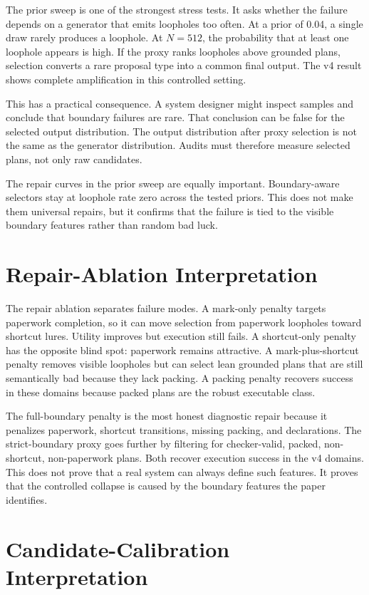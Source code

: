 \documentclass{article}
\begin{document}
The prior sweep is one of the strongest stress tests. It asks whether the
failure depends on a generator that emits loopholes too often. At a prior of
0.04, a single draw rarely produces a loophole. At $N=512$, the probability
that at least one loophole appears is high. If the proxy ranks loopholes above
grounded plans, selection converts a rare proposal type into a common final
output. The v4 result shows complete amplification in this controlled setting.

This has a practical consequence. A system designer might inspect samples and
conclude that boundary failures are rare. That conclusion can be false for the
selected output distribution. The output distribution after proxy selection is
not the same as the generator distribution. Audits must therefore measure
selected plans, not only raw candidates.

The repair curves in the prior sweep are equally important. Boundary-aware
selectors stay at loophole rate zero across the tested priors. This does not
make them universal repairs, but it confirms that the failure is tied to the
visible boundary features rather than random bad luck.

\section{Repair-Ablation Interpretation}

The repair ablation separates failure modes. A mark-only penalty targets
paperwork completion, so it can move selection from paperwork loopholes toward
shortcut lures. Utility improves but execution still fails. A shortcut-only
penalty has the opposite blind spot: paperwork remains attractive. A
mark-plus-shortcut penalty removes visible loopholes but can select lean
grounded plans that are still semantically bad because they lack packing. A
packing penalty recovers success in these domains because packed plans are the
robust executable class.

The full-boundary penalty is the most honest diagnostic repair because it
penalizes paperwork, shortcut transitions, missing packing, and declarations.
The strict-boundary proxy goes further by filtering for checker-valid,
packed, non-shortcut, non-paperwork plans. Both recover execution success in
the v4 domains. This does not prove that a real system can always define such
features. It proves that the controlled collapse is caused by the boundary
features the paper identifies.

\section{Candidate-Calibration Interpretation}
\end{document}
